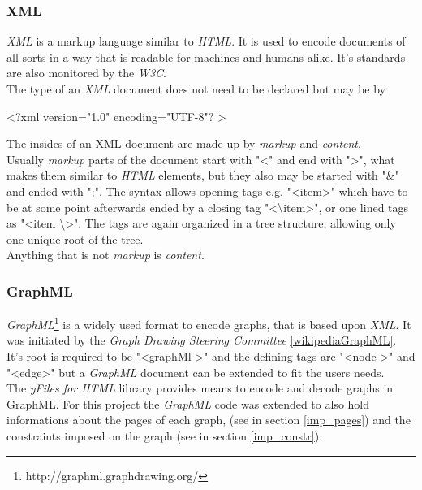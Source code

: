 \subsubsection{XML}
\textit{XML} is a markup language similar to \textit{HTML}. It is used to encode documents of all sorts in a way that is readable for machines and humans alike. 
It's standards are also monitored by the \textit{W3C}.\\
The type of an \textit{XML} document does not need to be declared but may be by
\begin{center}
\textless  ?xml version="1.0" encoding="UTF-8"? \textgreater
\end{center}
The insides of an XML document are made up by \textit{markup} and \textit{content}.\\
Usually \textit{markup} parts of the document start with "\textless " and end with "\textgreater", what makes them similar to \textit{HTML} elements, but they also may be started with "\&" and ended with ";". The syntax allows opening tags e.g. "\textless  item\textgreater" which have to be at some point afterwards ended by a closing tag "\textless  \textbackslash item\textgreater", or one lined tags as "\textless  item \textbackslash \textgreater". The tags are again organized in a tree structure, allowing only one unique root of the tree.\\
Anything that is not \textit{markup} is \textit{content}.
\subsubsection{GraphML}
\textit{GraphML}\footnote{http://graphml.graphdrawing.org/} is a widely used format to encode graphs, that is based upon \textit{XML}. It was initiated by the \textit{Graph Drawing Steering Committee} \ref{wikipediaGraphML}. It's root is required to be "\textless  graphMl \textgreater" and the defining tags are "\textless  node \textgreater" and "\textless  edge\textgreater" but a  \textit{GraphML} document can be extended to fit the users needs.\\
The \textit{yFiles for HTML} library provides means to encode and decode graphs in GraphML. For this project the \textit{GraphML} code was extended to also hold informations about the pages of each graph, (see in section \autoref{imp_pages}) and the constraints imposed on the graph (see in section \autoref{imp_constr}).

